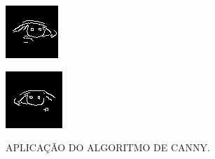 \begin{figure}[h!]
    \caption{APLICAÇÃO DO ALGORITMO DE CANNY.}
    \centering
    \begin{minipage}[b]{0.35\textwidth}
        \centering
        \includegraphics[width=0.9\linewidth]{fig/03_left_eye_edge.png}
        \label{fig:canny-esquerdo}
    \end{minipage}
    \hspace{0.5cm}
    \begin{minipage}[b]{0.35\textwidth}
        \centering
        \includegraphics[width=0.9\linewidth]{fig/03_right_eye_edge.png}
        \label{fig:canny-direito}
    \end{minipage}


\end{figure}
